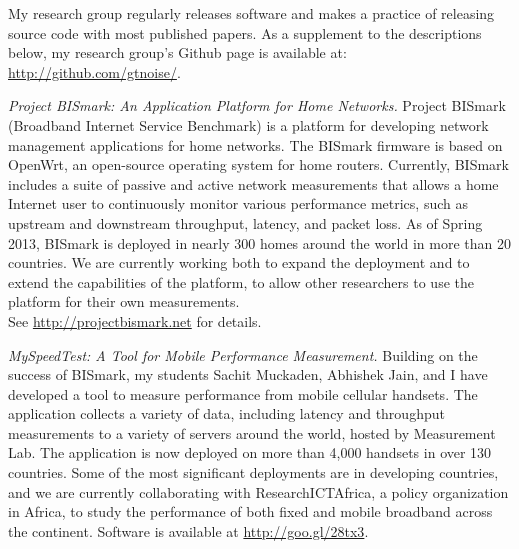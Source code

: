 My research group regularly releases software and makes a practice of
releasing source code with most published papers.  As a supplement to
the descriptions below, my research group's Github page is available at:
\url{http://github.com/gtnoise/}.

\begin{pub}
\item {\em Project BISmark: An Application Platform for Home Networks.}
  Project BISmark (Broadband Internet Service Benchmark) is a platform
  for developing network management applications for home networks.  The
  BISmark firmware is based on OpenWrt, an open-source operating system
  for home routers.  Currently, BISmark includes a suite of passive and
  active network measurements that allows a home Internet user to
  continuously monitor various performance metrics, such as upstream and
  downstream throughput, latency, and packet loss.  As of Spring 2013,
  BISmark is deployed in nearly 300 homes around the world in more than
  20 countries.  We are currently working both to expand the deployment
  and to extend the capabilities of the platform, to allow other
  researchers to use the platform for their own measurements.  \\ See
  \url{http://projectbismark.net} for details.

\item {\em MySpeedTest: A Tool for Mobile Performance Measurement.}
  Building on the success of BISmark, my students Sachit Muckaden,
  Abhishek Jain, and I have developed a tool to measure performance from
  mobile cellular handsets.  The application collects a variety of data,
  including latency and throughput measurements to a variety of servers
  around the world, hosted by Measurement Lab.  The application is now
  deployed on more than 4,000 handsets in over 130 countries.  Some of
  the most significant deployments are in developing countries, and we
  are currently collaborating with ResearchICTAfrica, a policy
  organization in Africa, to study the performance of both fixed and
  mobile broadband across the continent.  Software is available at
  \url{http://goo.gl/28tx3}.


\end{pub}
